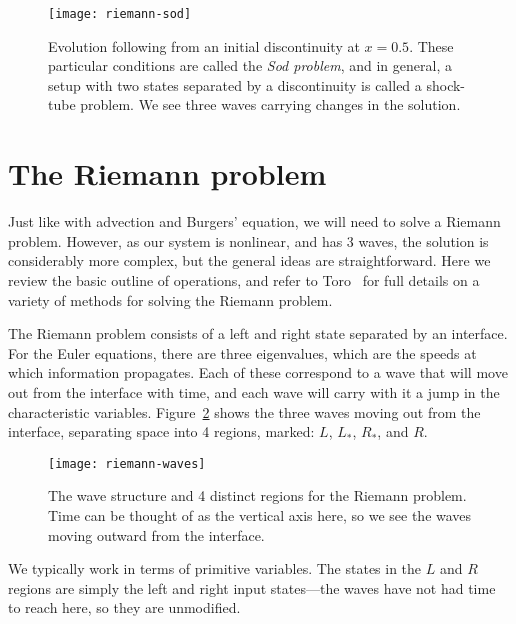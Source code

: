 \begin{figure}
\centering
\texttt{[image: riemann-sod]}
\caption[The Sod problem]{\label{fig:sod} Evolution following from an initial
  discontinuity at $x = 0.5$.  These particular conditions are called
  the {\em Sod problem}, and in general, a setup with two states
  separated by a discontinuity is called a shock-tube problem.  We see three
  waves carrying changes in the solution. \\
  }
\end{figure}






\section{The Riemann problem}

\label{euler:sec:riemann}

Just like with advection and Burgers' equation, we will need to solve
a Riemann problem.  However, as our system is nonlinear, and has 3
waves, the solution is considerably more complex, but the general
ideas are straightforward.  Here we review the basic outline of
operations, and refer to Toro~\cite{toro:1997} for full details on a
variety of methods for solving the Riemann problem.

The Riemann problem consists of a left and right state separated by an
interface.  For the Euler equations, there are three eigenvalues,
which are the speeds at which information propagates.  Each of these
correspond to a wave that will move out from the interface with time,
and each wave will carry with it a jump in the characteristic
variables.  Figure~\ref{fig:riemann:waves} shows the
three waves moving out from the interface, separating space into 4
regions, marked: $L$, $L_*$, $R_*$, and $R$.
\begin{figure}[h]
\centering
\texttt{[image: riemann-waves]}
\caption[The Riemann problem wave structure for the Euler
  equations]{\label{fig:riemann:waves} The wave structure and 4
  distinct regions for the Riemann problem.  Time can be thought of as
  the vertical axis here, so we see the waves moving outward from the
  interface.}
\end{figure}
We typically work in terms of primitive variables.  The states in the
$L$ and $R$ regions are simply the left and right input states---the
waves have not had time to reach here, so they are unmodified.

